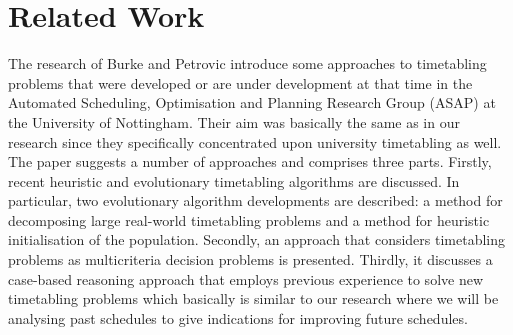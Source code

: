 \section{Related Work}
The research of Burke and Petrovic \cite{recentResearchDirectionsInAutomatedTimetabling} introduce some approaches to timetabling problems that were developed or are under development at that time in the Automated Scheduling, Optimisation and Planning Research Group
(ASAP) at the University of Nottingham. Their aim was basically the same as in our research since they specifically concentrated upon university timetabling as well. The paper suggests a number of approaches and comprises three parts. Firstly, recent
heuristic and evolutionary timetabling algorithms are discussed. In particular, two evolutionary algorithm developments
are described: a method for decomposing large real-world timetabling problems and a method for heuristic
initialisation of the population. Secondly, an approach that considers timetabling problems as multicriteria decision
problems is presented. Thirdly, it discusses a case-based reasoning approach that employs previous experience to solve
new timetabling problems which basically is similar to our research where we will be analysing past schedules to give indications for improving future schedules. 